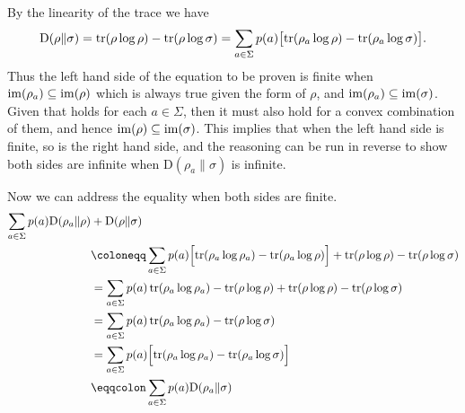 \documentclass[boxes,pages,color=SeaGreen]{homework}
\newcommand{\relEn}{\mathrm{D}}
\begin{document}
\begin{solution}
    By the linearity of the trace we have
    \begin{align*}
        \relEn(\rho \| \sigma) = \tr(\rho\log\rho) - \tr(\rho\log\sigma) = \sum_{a\in\Sigma}p(a)\qty\big[\tr(\rho_a\log\rho) - \tr(\rho_a\log\sigma)].
    \end{align*} %
    Thus the left hand side of the equation to be proven is finite when $\operatorname{im}(\rho_a) \subseteq \operatorname{im}(\rho)$ which is always true given the form of $\rho$, and $\operatorname{im}(\rho_a) \subseteq \operatorname{im}(\sigma)$.
    Given that holds for each $a \in \Sigma$, then it must also hold for a convex combination of them, and hence $\operatorname{im}(\rho) \subseteq \operatorname{im}(\sigma)$.
    This implies that when the left hand side is finite, so is the right hand side, and the reasoning can be run in reverse to show both sides are infinite when $\mathrm{D}(\rho_a \| \sigma)$ is infinite.

    Now we can address the equality when both sides are finite.
    \begin{align*}
        \sum_{a\in\Sigma} p(a) \mathrm{D}(\rho_a \| \rho) & + \mathrm{D}(\rho \| \sigma)                                                                                                  \\
                                                          & \defeq \sum_{a\in\Sigma} p(a) \qty\Big[\tr(\rho_a\log\rho_a) - \tr(\rho_a\log\rho)] + \tr(\rho\log\rho) - \tr(\rho\log\sigma) \\
                                                          & = \sum_{a\in\Sigma} p(a) \tr(\rho_a\log\rho_a) - \tr(\rho\log\rho) + \tr(\rho\log\rho) - \tr(\rho\log\sigma)                  \\
                                                          & = \sum_{a\in\Sigma} p(a) \tr(\rho_a\log\rho_a) - \tr(\rho\log\sigma)                                                          \\
                                                          & = \sum_{a\in\Sigma} p(a) \qty\Big[\tr(\rho_a\log\rho_a) - \tr(\rho_a\log\sigma)]                                              \\
                                                          & \eqdef \sum_{a\in\Sigma} p(a) \mathrm{D}(\rho_a \| \sigma)
    \end{align*}

\end{solution}

\end{document}
